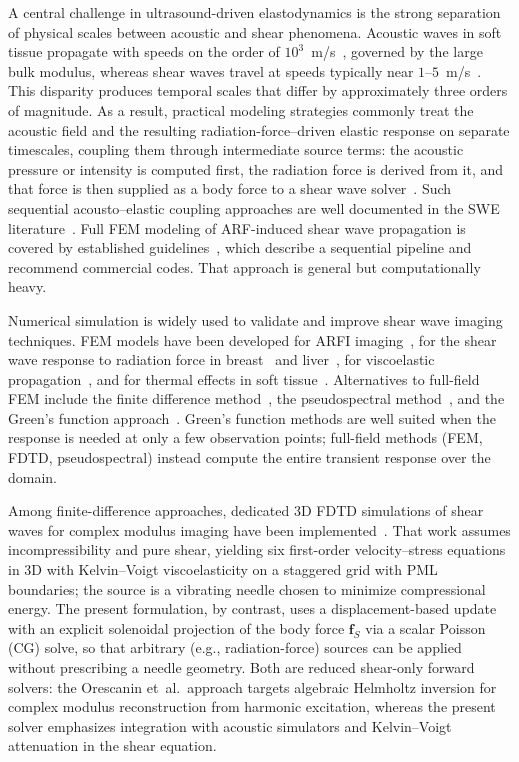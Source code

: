 \documentclass{iopjournal}
\begin{document}
A central challenge in ultrasound-driven elastodynamics is the strong separation
of physical scales between acoustic and shear phenomena. Acoustic waves in soft
tissue propagate with speeds on the order of
$10^3$~m/s~\cite{szabo2014diagnostic,duck1990physical}, governed by the large
bulk modulus, whereas shear waves travel at speeds typically near
$1$--$5$~m/s~\cite{sandrin2003transient,tanter2008quantitative}. This disparity
produces temporal scales that differ by approximately three orders of magnitude.
As a result, practical modeling strategies commonly treat the acoustic field and
the resulting radiation-force--driven elastic response on separate timescales,
coupling them through intermediate source terms: the acoustic pressure or
intensity is computed first, the radiation force is derived from it, and that
force is then supplied as a body force to a shear wave
solver~\cite{yang2018gpu}. Such sequential acousto--elastic coupling
approaches are well documented in the SWE
literature~\cite{bercoff2004supersonic,barr2015elastography}.
Full FEM modeling of ARF-induced shear wave propagation is covered by
established guidelines~\cite{palmeri2017fem}, which describe a sequential
pipeline and recommend commercial codes. That approach is general but
computationally heavy.

Numerical simulation is widely used to validate and improve shear wave imaging
techniques. FEM models have been developed for ARFI
imaging~\cite{palmeri2005fem}, for the shear wave response to radiation force
in breast~\cite{nightingale2000fem} and liver~\cite{palmeri2008liver}, for
viscoelastic propagation~\cite{lee2012viscoelastic}, and for thermal effects in
soft tissue~\cite{palmeri2004thermal}. Alternatives to full-field FEM include
the finite difference
method~\cite{orescanin2011fdtd,langdon2015}, the pseudospectral
method~\cite{qiang2015}, and the Green's function
approach~\cite{gennisson2003,bercoff2004supersonic,calle2005,chatelin2016}.
Green's function methods are well suited when the response is needed at only a
few observation points; full-field methods (FEM, FDTD, pseudospectral) instead
compute the entire transient response over the domain.

Among finite-difference approaches, dedicated 3D FDTD simulations of shear
waves for complex modulus imaging have been
implemented~\cite{orescanin2011fdtd}. That work assumes incompressibility and
pure shear, yielding six first-order velocity--stress equations in 3D with
Kelvin--Voigt viscoelasticity on a staggered grid with PML boundaries; the
source is a vibrating needle chosen to minimize compressional energy. The
present formulation, by contrast, uses a displacement-based update with an
explicit solenoidal projection of the body force $\mathbf{f}_S$ via a scalar
Poisson (CG) solve, so that arbitrary (e.g., radiation-force) sources can be
applied without prescribing a needle geometry. Both are reduced shear-only
forward solvers: the Orescanin et~al.\ approach targets algebraic Helmholtz
inversion for complex modulus reconstruction from harmonic excitation, whereas
the present solver emphasizes integration with acoustic simulators and
Kelvin--Voigt attenuation in the shear equation.
\end{document}
